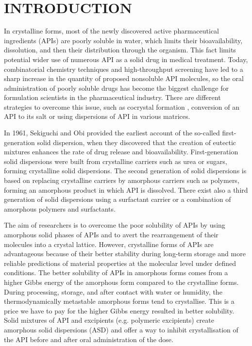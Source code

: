 \newpage
\section{INTRODUCTION}
\setcounter{page}{1}
\enlargethispage{\baselineskip}

In crystalline forms, most of the newly discovered active pharmaceutical ingredients (APIs) are poorly soluble in water, which limits their bioavailability, dissolution, and then their distribution through the organism. This fact limits potential wider use of numerous API as a solid drug in medical treatment. Today, combinatorial chemistry techniques and high-throughput screening have led to a sharp increase in the quantity of proposed nonsoluble API molecules, so the oral administration of poorly soluble drugs has become the biggest challenge for formulation scientists in the pharmaceutical industry. \cite{leuner_improving_2000} There are different strategies to overcome this issue, such as cocrystal formation \cite{batisai_solubility_2021}, conversion of an API to its salt \cite{huang_impact_2004} or using dispersions of API in various matrices. \cite{srinarong_improved_2011}

In 1961, Sekiguchi and Obi provided the earliest account of the so-called first-generation solid dispersion, when they discovered that the creation of eutectic mixtures enhances the rate of drug release and bioavailability. First-generation solid dispersions were built from crystalline carriers such as urea or sugars, forming crystalline solid dispersions. The second generation of solid dispersions is based on replacing crystalline carriers by amorphous carriers such as polymers, forming an amorphous product in which API is dissolved. There exist also a third generation of solid dispersions using a surfactant carrier or a combination of amorphous polymers and surfactants.~\cite{vasconcelos_solid_2007}

The aim of researchers is to overcome the poor solubility of APIs by using amorphous solid phases of APIs and to avert the rearrangement of their molecules into a crystal lattice. However, crystalline forms of APIs are advantageous because of their better stability during long-term storage and more reliable predictions of material properties at the molecular level under defined conditions. \cite{caron_comparison_2011} The better solubility of APIs in amorphous forms comes from a higher Gibbs energy of the amorphous form compared to the crystalline forms. During processing, storage, and after contact with water or humidity, the thermodynamically metastable amorphous forms tend to crystallise. This is a price we have to pay for the higher Gibbs energy resulted in better solubility. Solid mixtures of API and excipients (e.g. polymeric excipients) create amorphous solid dispersions (ASD) and offer a way to inhibit crystallisation of the API before and after oral administration of the dose. \cite{prudic_thermodynamic_2014}


